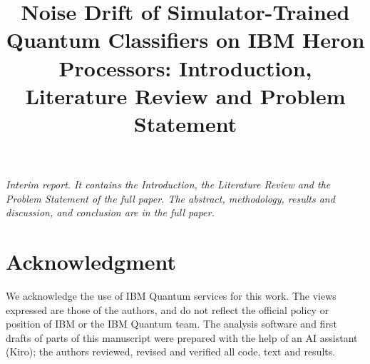 \documentclass[10pt,conference]{IEEEtran}
\newif\ifshowrefs
\begin{document}
\title{Noise Drift of Simulator-Trained Quantum Classifiers on IBM Heron Processors:
Introduction, Literature Review and Problem Statement}

\author{\qdauthor}

\maketitle

\noindent\textit{Interim report. It contains the Introduction, the Literature Review and the
Problem Statement of the full paper. The abstract, methodology, results and discussion, and
conclusion are in the full paper.}





\section*{Acknowledgment}
We acknowledge the use of IBM Quantum services for this work. The views expressed are those of
the authors, and do not reflect the official policy or position of IBM or the IBM Quantum team.
The analysis software and first drafts of parts of this manuscript were prepared with the help
of an AI assistant (Kiro); the authors reviewed, revised and verified all code, text and results.

\ifshowrefs\else{}\vbox\bgroup\fi


\ifshowrefs\else\egroup\fi
\end{document}

